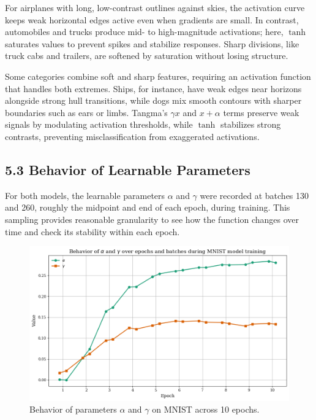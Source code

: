 \documentclass{article}
\begin{document}
\vspace{4pt}
\noindent
For airplanes with long, low-contrast outlines against skies, the activation curve keeps weak horizontal edges active even when gradients are small. In contrast, automobiles and trucks produce mid- to high-magnitude activations; here, \(\tanh\) saturates values to prevent spikes and stabilize responses. Sharp divisions, like truck cabs and trailers, are softened by saturation without losing structure.

\vspace{4pt}
\noindent
Some categories combine soft and sharp features, requiring an activation function that handles both extremes. Ships, for instance, have weak edges near horizons alongside strong hull transitions, while dogs mix smooth contours with sharper boundaries such as ears or limbs. Tangma’s \(\gamma x\) and \(x + \alpha\) terms preserve weak signals by modulating activation thresholds, while \(\tanh\) stabilizes strong contrasts, preventing misclassification from exaggerated activations.


\subsection*{5.3 Behavior of Learnable Parameters}

For both models, the learnable parameters $\alpha$ and $\gamma$ were recorded at batches 130 and 260, roughly the midpoint and end of each epoch, during training. This sampling provides reasonable granularity to see how the function changes over time and check its stability within each epoch. 





\begin{figure}[H]
    \centering
    \includegraphics[width=0.6\linewidth]{mnist_para.png}
    \caption{Behavior of parameters $\alpha$ and $\gamma$ on MNIST across 10 epochs.}
    \label{fig:mnist-parameters}
\end{figure}
\end{document}
